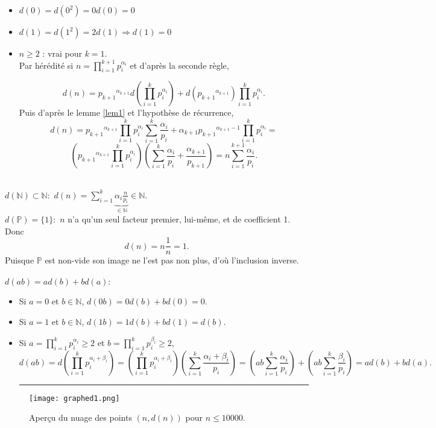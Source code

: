 \documentclass[a4paper, 12pt]{article}
\newcommand{\N}{\mathbb{N}}
\newcommand{\Pm}{\mathbb{P}}
\newcommand{\Prv}{\noindent{\it Preuve. }}
\newcommand{\cqfd}{\rule{0.2cm}{0.2cm}}
\begin{document}
\Prv
{}
\begin{itemize}
\item $d(0)=d(0^{2})=0d(0)=0$
\item $d(1)=d(1^{2})=2d(1) \Rightarrow d(1)=0$

\item
$n \ge 2$ : vrai pour $k=1$.\\
	Par hérédité si $n = \prod_{i=1}^{k+1} p_i^{\alpha_i}$ et d'après la seconde règle,

\[d(n) = {p_{k+1}}^{\alpha_{k+1}}d(\prod_{i=1}^{k} p_i^{\alpha_i}) + d({p_{k+1}}^{\alpha_{k+1}}) \prod_{i=1}^{k} p_i^{\alpha_i}.\]
Puis d'après le lemme \ref{lem1} et l'hypothèse de récurrence,
      \[d(n) = {p_{k+1}}^{\alpha_{k+1}} \prod_{i=1}^{k} p_i^{\alpha_i} \sum_{i=1}^{k} \frac{\alpha_i}{p_i} + \alpha_{k+1}{p_{k+1}}^{\alpha_{k+1}-1}  \prod_{i=1}^{k} p_i^{\alpha_i} = \]
      \[({p_{k+1}}^{\alpha_{k+1}} \prod_{i=1}^{k} p_i^{\alpha_i}) (\sum_{i=1}^{k} \frac{\alpha_i}{p_i} + \frac{\alpha_{k+1}}{p_{k+1}}) = n \sum_{i=1}^{k+1} \frac{\alpha_i}{p_i}. \]
\end{itemize}

\\
\underline{$d(\N) \subset \N :$} $d(n) = \sum_{i=1}^{k} \underbrace{\alpha_i \frac{n}{p_i}}_{\in \N} \in \N$.\\
\underline{$d(\Pm) = \{1\} :$} $n$ n'a qu'un seul facteur premier, lui-même, et de coefficient 1. Donc \[d(n) = n \frac{1}{n}=1.\] Puisque $\Pm$ est non-vide son image ne l'est pas non plus, d'où l'inclusion inverse.\\\\
\underline{$d(ab)=ad(b)+bd(a) :$} \begin{itemize}
\item Si $a=0$ et $b \in \N$, $d(0b)=0d(b)+bd(0)=0.$
\item Si $a=1$ et $b \in \N$, $d(1b)=1d(b)+bd(1)=d(b).$
\item Si $a=\prod_{i=1}^{k} p_i^{\alpha_i} \ge2$ et $b= \prod_{i=1}^{k} p_i^{\beta_i}\ge2$,
\[ d(ab) = d(\prod_{i=1}^{k} p_i^{\alpha_i+\beta_i}) = (\prod_{i=1}^{k} p_i^{\alpha_i+\beta_i})(\sum_{i=1}^{k} \frac{\alpha_i+\beta_i}{p_i}) = (ab\sum_{i=1}^{k} \frac{\alpha_i}{p_i}) + (ab\sum_{i=1}^{k} \frac{\beta_i}{p_i}) = ad(b)+bd(a). \] \cqfd
\end{itemize}



\begin{figure}[ht]
\begin{center}
\texttt{[image: graphed1.png]}
\end{center}
\caption{\footnotesize{Aperçu du nuage des points $(n, d(n))$ pour $n \le 10000$.}}
\label{nuage 1}
\end{figure}
\end{document}
